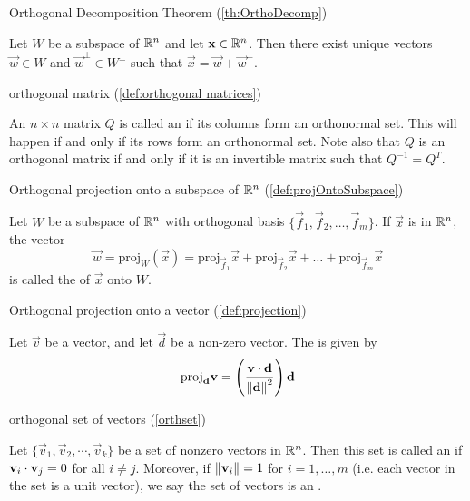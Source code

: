\documentclass{ximera}
\begin{document}
Orthogonal Decomposition Theorem (\ref{th:OrthoDecomp})
\begin{expandable}
    Let $W$ be a subspace of $\mathbb{R}^n$ and let $\mathbf{x} \in \mathbb{R}^n$.  Then there exist unique vectors $\vec{w} \in W$ and $\vec{w}^\perp \in W^\perp$ such that $\vec{x} = \vec{w} + \vec{w}^\perp$.
\end{expandable}

orthogonal matrix (\ref{def:orthogonal matrices})
\begin{expandable}
    An $n \times n$ matrix $Q$ is called an  if its columns form an orthonormal set.  This will happen if and only if its rows form an orthonormal set.  Note also that $Q$ is an orthogonal matrix if and only if it is an invertible matrix such that $Q^{-1}=Q^{T}$.
\end{expandable}

Orthogonal projection onto a subspace of $\mathbb{R}^n$ (\ref{def:projOntoSubspace})
\begin{expandable}
    Let $W$ be a subspace of $\mathbb{R}^n$ with orthogonal basis $\{\vec{f}_{1}, \vec{f}_{2}, \dots, \vec{f}_{m}\}$. If $\vec{x}$ is in $\mathbb{R}^n$, the vector
\begin{equation}
\vec{w}=\mbox{proj}_W(\vec{x}) = \mbox{proj}_{\vec{f}_1}\vec{x} + \mbox{proj}_{\vec{f}_2}\vec{x} + \dots + \mbox{proj}_{\vec{f}_m}\vec{x}
\end{equation}
is called the  of $\vec{x}$ onto $W$. 
\end{expandable}

Orthogonal projection onto a vector (\ref{def:projection})
\begin{expandable}
    Let $\vec{v}$ be a vector, and let $\vec{d}$ be a non-zero vector.  The  is given by 
$$\mbox{proj}_{\mathbf{d}}\mathbf{v}=\left(\frac{\mathbf{v}\cdot\mathbf{d}}{\left\lVert\mathbf{d}\right\rVert^2}\right)\mathbf{d}$$
\end{expandable}

orthogonal set of vectors (\ref{orthset})
\begin{expandable}
    Let $\{ \vec{v}_1, \vec{v}_2, \cdots, \vec{v}_k \}$ be a set of nonzero
vectors in $\mathbb{R}^n$. Then this set is called an
 if 
$\mathbf{v}_i \cdot \mathbf{v}_j = 0$ for all $i \neq j$.
Moreover, if $\left\lVert\mathbf{v}_i\right\rVert=1$ for $i=1,\ldots,m$ (i.e. each vector in the set is a unit vector), we say the set of vectors is an .
\end{expandable}
\end{document}
